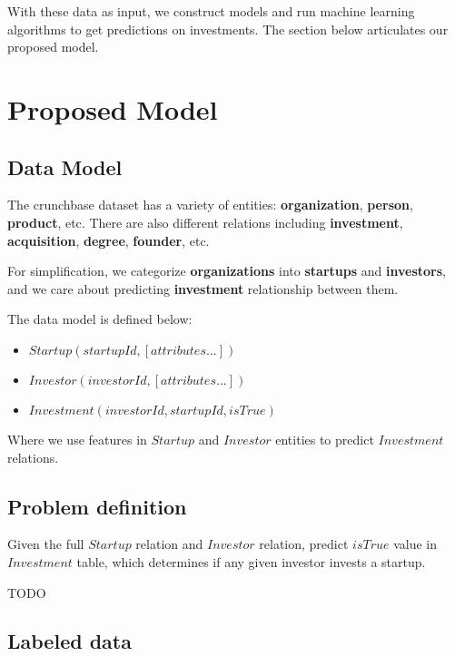 With these data as input, we construct models and run machine learning
algorithms to get predictions on investments. The section below
articulates our proposed model.

\section{Proposed Model}\label{proposed-model}

\subsection{Data Model}\label{data-model}

The crunchbase dataset has a variety of entities: \textbf{organization},
\textbf{person}, \textbf{product}, etc. There are also different
relations including \textbf{investment}, \textbf{acquisition},
\textbf{degree}, \textbf{founder}, etc.

For simplification, we categorize \textbf{organizations} into
\textbf{startups} and \textbf{investors}, and we care about predicting
\textbf{investment} relationship between them.

The data model is defined below:

\begin{itemize}
\itemsep1pt\parskip0pt
\item
  \(Startup(startupId, [attributes...])\)
\item
  \(Investor(investorId, [attributes...])\)
\item
  \(Investment(investorId, startupId, isTrue)\)
\end{itemize}

Where we use features in \(Startup\) and \(Investor\) entities to
predict \(Investment\) relations.

\subsection{Problem definition}\label{problem-definition}

Given the full \(Startup\) relation and \(Investor\) relation, predict
\(isTrue\) value in \(Investment\) table, which determines if any given
investor invests a startup.

TODO

\subsection{Labeled data}\label{labeled-data}

